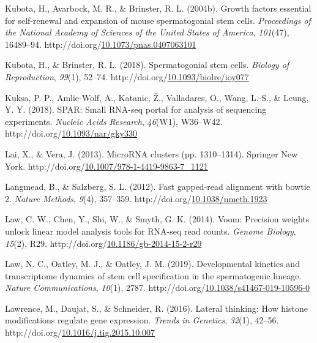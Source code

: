 \documentclass[12pt,twoside]{reedthesis}
\newlength{\cslhangindent}
\newenvironment{CSLReferences}[2] %
 {%
  \setlength{\parindent}{0pt}
  \ifodd #1 \everypar{\setlength{\hangindent}{\cslhangindent}}\ignorespaces\fi
  \ifnum #2 > 0
  \setlength{\parskip}{#2\baselineskip}
  \fi
 }%
 {}
\begin{document}
\begin{CSLReferences}{1}{0}
\leavevmode{}%
Kubota, H., Avarbock, M. R., \& Brinster, R. L. (2004b). Growth factors essential for self-renewal and expansion of mouse spermatogonial stem cells. \emph{Proceedings of the National Academy of Sciences of the United States of America}, \emph{101}(47), 16489--94. http://doi.org/\href{https://doi.org/10.1073/pnas.0407063101}{10.1073/pnas.0407063101}

\leavevmode{}%
Kubota, H., \& Brinster, R. L. (2018). Spermatogonial stem cells. \emph{Biology of Reproduction}, \emph{99}(1), 52--74. http://doi.org/\href{https://doi.org/10.1093/biolre/ioy077}{10.1093/biolre/ioy077}

\leavevmode{}%
Kuksa, P. P., Amlie-Wolf, A., Katanic, Ž., Valladares, O., Wang, L.-S., \& Leung, Y. Y. (2018). SPAR: Small RNA-seq portal for analysis of sequencing experiments. \emph{Nucleic Acids Research}, \emph{46}(W1), W36--W42. http://doi.org/\href{https://doi.org/10.1093/nar/gky330}{10.1093/nar/gky330}

\leavevmode{}%
Lai, X., \& Vera, J. (2013). MicroRNA clusters (pp. 1310--1314). Springer New York. http://doi.org/\href{https://doi.org/10.1007/978-1-4419-9863-7_1121}{10.1007/978-1-4419-9863-7\_1121}

\leavevmode{}%
Langmead, B., \& Salzberg, S. L. (2012). Fast gapped-read alignment with bowtie 2. \emph{Nature Methods}, \emph{9}(4), 357--359. http://doi.org/\href{https://doi.org/10.1038/nmeth.1923}{10.1038/nmeth.1923}

\leavevmode{}%
Law, C. W., Chen, Y., Shi, W., \& Smyth, G. K. (2014). Voom: Precision weights unlock linear model analysis tools for RNA-seq read counts. \emph{Genome Biology}, \emph{15}(2), R29. http://doi.org/\href{https://doi.org/10.1186/gb-2014-15-2-r29}{10.1186/gb-2014-15-2-r29}

\leavevmode{}%
Law, N. C., Oatley, M. J., \& Oatley, J. M. (2019). Developmental kinetics and transcriptome dynamics of stem cell specification in the spermatogenic lineage. \emph{Nature Communications}, \emph{10}(1), 2787. http://doi.org/\href{https://doi.org/10.1038/s41467-019-10596-0}{10.1038/s41467-019-10596-0}

\leavevmode{}%
Lawrence, M., Daujat, S., \& Schneider, R. (2016). Lateral thinking: How histone modifications regulate gene expression. \emph{Trends in Genetics}, \emph{32}(1), 42--56. http://doi.org/\href{https://doi.org/10.1016/j.tig.2015.10.007}{10.1016/j.tig.2015.10.007}


\end{CSLReferences}
\end{document}
